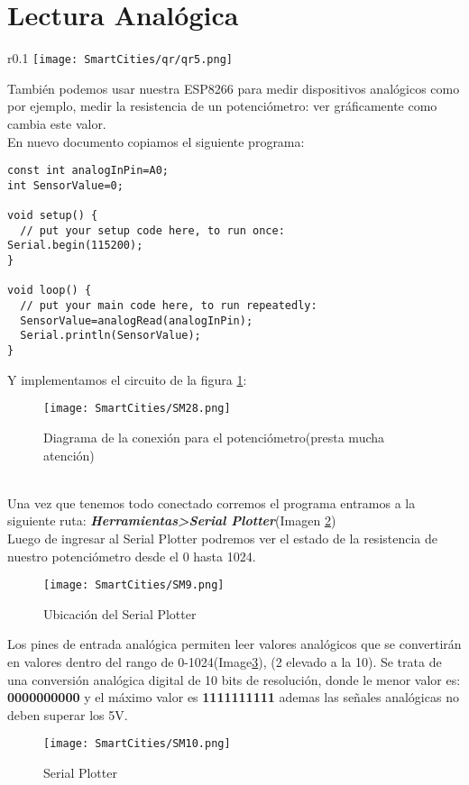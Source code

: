 \documentclass[11pt,fleqn]{book} %
\begin{document}
\section{Lectura Analógica}
\begin{wrapfigure}{r}{0.1\linewidth}
\centering\texttt{[image: SmartCities/qr/qr5.png]}
\caption{QR program: 5.GraphAnalog}
\label{fig:qr5}
\end{wrapfigure}
También podemos usar nuestra ESP8266 para medir dispositivos analógicos como por ejemplo, medir la resistencia de un potenciómetro:  ver gráficamente como cambia este valor.\\
En nuevo documento copiamos el siguiente programa:
\begin{lstlisting}[caption={Medir la resistencia de un potenciómetro},captionpos=b]
const int analogInPin=A0;
int SensorValue=0;

void setup() {
  // put your setup code here, to run once:
Serial.begin(115200);
}

void loop() {
  // put your main code here, to run repeatedly:
  SensorValue=analogRead(analogInPin);
  Serial.println(SensorValue);
}
\end{lstlisting}
Y implementamos el circuito de la figura \ref{fig:readanalog potenciometer}:
\begin{figure}[h!]
\centering\texttt{[image: SmartCities/SM28.png]}
\caption{Diagrama de la conexión para el potenciómetro(presta mucha atención)}
\label{fig:readanalog potenciometer}
\end{figure}
\\Una vez que tenemos todo conectado corremos el programa entramos a la siguiente ruta: \textbf{\textit{Herramientas>Serial Plotter}}(Imagen \ref{fig:UbiSerialPlotter})\\
Luego de ingresar al Serial Plotter podremos ver el estado de la resistencia de nuestro potenciómetro desde el 0 hasta 1024.\\
\begin{figure}[h]
\centering\texttt{[image: SmartCities/SM9.png]}
\caption{Ubicación del Serial Plotter}
\label{fig:UbiSerialPlotter}
\end{figure}
Los pines de entrada analógica permiten leer valores analógicos que se convertirán en valores dentro del rango de 0-1024(Image\ref{fig:SerialPlotter}), (2 elevado a la 10). Se trata de una conversión analógica digital de 10 bits de resolución, donde le menor valor es: \textbf{0000000000} y el máximo valor es \textbf{1111111111} ademas las señales analógicas no deben superar los 5V.
\begin{figure}[h!]
\centering\texttt{[image: SmartCities/SM10.png]}
\caption{Serial Plotter}
\label{fig:SerialPlotter}
\end{figure}
\newpage
\end{document}
